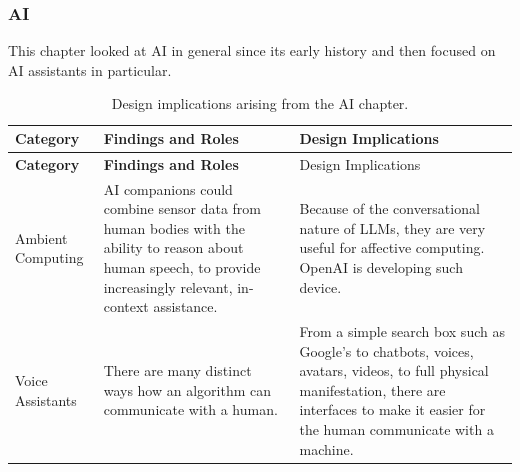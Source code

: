 \documentclass[
  12pt,
  letterpaper,
  DIV=11,
  numbers=noendperiod]{scrartcl}
\begin{document}
\subsubsection{AI}\label{ai-1}

This chapter looked at AI in general since its early history and then
focused on AI assistants in particular.

\begin{longtable}[]{@{}
  >{\raggedright\arraybackslash}p{}
  >{\raggedright\arraybackslash}p{}
  >{\raggedright\arraybackslash}p{}@{}}
\caption{Design implications arising from the AI
chapter.}\tabularnewline
\toprule\noalign{}
\begin{minipage}[b]{\linewidth}\raggedright
\textbf{Category}
\end{minipage} & \begin{minipage}[b]{\linewidth}\raggedright
\textbf{Findings and Roles}
\end{minipage} & \begin{minipage}[b]{\linewidth}\raggedright
Design Implications
\end{minipage} \\
\midrule\noalign{}
\endfirsthead
\toprule\noalign{}
\begin{minipage}[b]{\linewidth}\raggedright
\textbf{Category}
\end{minipage} & \begin{minipage}[b]{\linewidth}\raggedright
\textbf{Findings and Roles}
\end{minipage} & \begin{minipage}[b]{\linewidth}\raggedright
Design Implications
\end{minipage} \\
\midrule\noalign{}
\endhead
\bottomrule\noalign{}
\endlastfoot
Ambient Computing & AI companions could combine sensor data from human
bodies with the ability to reason about human speech, to provide
increasingly relevant, in-context assistance. & Because of the
conversational nature of LLMs, they are very useful for affective
computing. OpenAI is developing such device. \\
Voice Assistants & There are many distinct ways how an algorithm can
communicate with a human. & From a simple search box such as Google's to
chatbots, voices, avatars, videos, to full physical manifestation, there
are interfaces to make it easier for the human communicate with a
machine. \\

\end{longtable}
\end{document}
